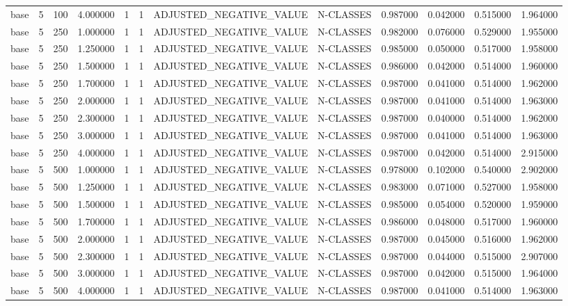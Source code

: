 \begin{tabular}{lrrrllllrrrr}
base & 5 & 100 & 4.000000 & 1 & 1 & ADJUSTED_NEGATIVE_VALUE & N-CLASSES & 0.987000 & 0.042000 & 0.515000 & 1.964000 \\
base & 5 & 250 & 1.000000 & 1 & 1 & ADJUSTED_NEGATIVE_VALUE & N-CLASSES & 0.982000 & 0.076000 & 0.529000 & 1.955000 \\
base & 5 & 250 & 1.250000 & 1 & 1 & ADJUSTED_NEGATIVE_VALUE & N-CLASSES & 0.985000 & 0.050000 & 0.517000 & 1.958000 \\
base & 5 & 250 & 1.500000 & 1 & 1 & ADJUSTED_NEGATIVE_VALUE & N-CLASSES & 0.986000 & 0.042000 & 0.514000 & 1.960000 \\
base & 5 & 250 & 1.700000 & 1 & 1 & ADJUSTED_NEGATIVE_VALUE & N-CLASSES & 0.987000 & 0.041000 & 0.514000 & 1.962000 \\
base & 5 & 250 & 2.000000 & 1 & 1 & ADJUSTED_NEGATIVE_VALUE & N-CLASSES & 0.987000 & 0.041000 & 0.514000 & 1.963000 \\
base & 5 & 250 & 2.300000 & 1 & 1 & ADJUSTED_NEGATIVE_VALUE & N-CLASSES & 0.987000 & 0.040000 & 0.514000 & 1.962000 \\
base & 5 & 250 & 3.000000 & 1 & 1 & ADJUSTED_NEGATIVE_VALUE & N-CLASSES & 0.987000 & 0.041000 & 0.514000 & 1.963000 \\
base & 5 & 250 & 4.000000 & 1 & 1 & ADJUSTED_NEGATIVE_VALUE & N-CLASSES & 0.987000 & 0.042000 & 0.514000 & 2.915000 \\
base & 5 & 500 & 1.000000 & 1 & 1 & ADJUSTED_NEGATIVE_VALUE & N-CLASSES & 0.978000 & 0.102000 & 0.540000 & 2.902000 \\
base & 5 & 500 & 1.250000 & 1 & 1 & ADJUSTED_NEGATIVE_VALUE & N-CLASSES & 0.983000 & 0.071000 & 0.527000 & 1.958000 \\
base & 5 & 500 & 1.500000 & 1 & 1 & ADJUSTED_NEGATIVE_VALUE & N-CLASSES & 0.985000 & 0.054000 & 0.520000 & 1.959000 \\
base & 5 & 500 & 1.700000 & 1 & 1 & ADJUSTED_NEGATIVE_VALUE & N-CLASSES & 0.986000 & 0.048000 & 0.517000 & 1.960000 \\
base & 5 & 500 & 2.000000 & 1 & 1 & ADJUSTED_NEGATIVE_VALUE & N-CLASSES & 0.987000 & 0.045000 & 0.516000 & 1.962000 \\
base & 5 & 500 & 2.300000 & 1 & 1 & ADJUSTED_NEGATIVE_VALUE & N-CLASSES & 0.987000 & 0.044000 & 0.515000 & 2.907000 \\
base & 5 & 500 & 3.000000 & 1 & 1 & ADJUSTED_NEGATIVE_VALUE & N-CLASSES & 0.987000 & 0.042000 & 0.515000 & 1.964000 \\
base & 5 & 500 & 4.000000 & 1 & 1 & ADJUSTED_NEGATIVE_VALUE & N-CLASSES & 0.987000 & 0.041000 & 0.514000 & 1.963000 \\

\end{tabular}
